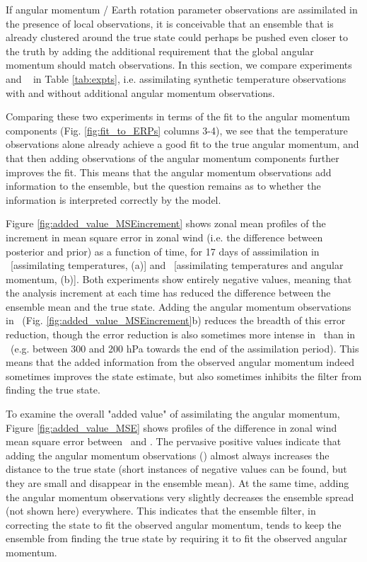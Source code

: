 If angular momentum / Earth rotation parameter observations are assimilated in the presence of local observations, it is conceivable that an ensemble that is already clustered around the true state could perhaps be pushed even closer to the truth by adding the additional requirement that the global angular momentum should match observations. 
In this section, we compare experiments \RST~ and \ERPRST~ in Table \ref{tab:expts}, i.e. assimilating synthetic temperature observations with and without additional angular momentum observations.

Comparing these two experiments in terms of the fit to the angular momentum components (Fig. \ref{fig:fit_to_ERPs} columns 3-4), we see that the temperature observations alone already achieve a good fit to the true angular momentum, and that 
then adding observations of the angular momentum components further improves the fit.  
This means that the angular momentum observations add information to the ensemble, but the question remains as to whether the information is interpreted correctly by the model.

Figure \ref{fig:added_value_MSEincrement} shows zonal mean profiles of the increment in mean square error in zonal wind (i.e. the difference between posterior and prior) as a function of time, for 17 days of asssimilation in \RST~[assimilating temperatures, (a)] and \ERPRST~[assimilating temperatures and angular momentum, (b)].  
Both experiments show entirely negative values, meaning that the analysis increment at each time has reduced the difference between the ensemble mean and the true state.  
Adding the angular momentum observations in \ERPRST~(Fig. \ref{fig:added_value_MSEincrement}b) reduces the breadth of this error reduction, though the error reduction is also sometimes more intense in \ERPRST~than in \RST~(e.g. between 300 and 200 hPa towards the end of the assimilation period). 
This means that the added information from the observed angular momentum indeed sometimes improves the state estimate, but also sometimes inhibits the filter from finding the true state. 

To examine the overall "added value" of assimilating the angular momentum, Figure \ref{fig:added_value_MSE} shows profiles of the difference in zonal wind mean square error between \ERPRST~and \RST. 
The pervasive positive values indicate that adding the angular momentum observations (\ERPRST) almost always increases the distance to the true state (short instances of negative values can be found, but they are small and disappear in the ensemble mean). 
At the same time, adding the angular momentum observations very slightly decreases the ensemble spread (not shown here) everywhere.  
This indicates that the ensemble filter, in correcting the state to fit the observed angular momentum, tends to keep the ensemble from finding the true state by requiring it to fit the observed angular momentum.  

